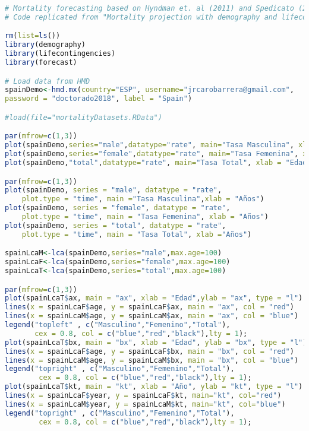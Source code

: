 \begin{lstlisting}[language=R, caption=C\'odigo R para modelo de simulaci\'on estoc\'astica de mortalidad correspondiente a la sección 2.3]
# Mortality forecasting based on Hyndman et. al (2011) and Spedicato (2013).
# Code replicated from "Mortality projection with demography and lifecontingencies packages" adapated to spanish population.

rm(list=ls())
library(demography)
library(lifecontingencies)
library(forecast)

# Load data from HMD
spainDemo<-hmd.mx(country="ESP", username="jrcarobarrera@gmail.com",
password = "doctorado2018", label = "Spain") 

#load(file="mortalityDatasets.RData")

par(mfrow=c(1,3))
plot(spainDemo,series="male",datatype="rate", main="Tasa Masculina", xlab = "Edad")
plot(spainDemo,series="female",datatype="rate", main="Tasa Femenina", xlab = "Edad")
plot(spainDemo,"total",datatype="rate", main="Tasa Total", xlab = "Edad")

par(mfrow=c(1,3))
plot(spainDemo, series = "male", datatype = "rate",
    plot.type = "time", main ="Tasa Masculina",xlab = "Años")
plot(spainDemo, series = "female", datatype = "rate",
    plot.type = "time", main = "Tasa Femenina", xlab = "Años")
plot(spainDemo, series = "total", datatype = "rate",
    plot.type = "time", main = "Tasa Total", xlab ="Años")

spainLcaM<-lca(spainDemo,series="male",max.age=100)
spainLcaF<-lca(spainDemo,series="female",max.age=100)
spainLcaT<-lca(spainDemo,series="total",max.age=100)

par(mfrow=c(1,3))
plot(spainLcaT$ax, main = "ax", xlab = "Edad",ylab = "ax", type = "l")
lines(x = spainLcaF$age, y = spainLcaF$ax, main = "ax", col = "red")
lines(x = spainLcaM$age, y = spainLcaM$ax, main = "ax", col = "blue")
legend("topleft" , c("Masculino","Femenino","Total"),
       cex = 0.8, col = c("blue","red","black"),lty = 1);
plot(spainLcaT$bx, main = "bx", xlab = "Edad", ylab = "bx", type = "l")
lines(x = spainLcaF$age, y = spainLcaF$bx, main = "bx", col = "red")
lines(x = spainLcaM$age, y = spainLcaM$bx, main = "bx", col = "blue")
legend("topright" , c("Masculino","Femenino","Total"),
        cex = 0.8, col = c("blue","red","black"),lty = 1);
plot(spainLcaT$kt, main = "kt", xlab = "Año", ylab = "kt", type = "l")
lines(x = spainLcaF$year, y = spainLcaF$kt, main="kt", col="red")
lines(x = spainLcaM$year, y = spainLcaM$kt, main="kt", col="blue")
legend("topright" , c("Masculino","Femenino","Total"),
        cex = 0.8, col = c("blue","red","black"),lty = 1);


\end{lstlisting}
